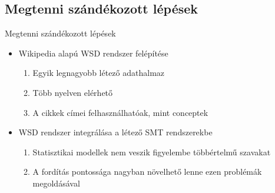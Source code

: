 \subsection{Megtenni szándékozott lépések}

\begin{frame}{Megtenni szándékozott lépések}
	
	\begin{itemize}
		
		\item Wikipedia alapú WSD rendszer felépítése
		\begin{enumerate}
			\item Egyik legnagyobb létező adathalmaz
			\item Több nyelven elérhető
			\item A cikkek címei felhasználhatóak, mint conceptek
		\end{enumerate}
		
		\item WSD rendszer integrálása a létező SMT rendszerekbe
		\begin{enumerate}
			\item Statisztikai modellek nem veszik figyelembe többértelmű szavakat
			\item A fordítás pontossága nagyban növelhető lenne ezen problémák megoldásával
		\end{enumerate}
		
	\end{itemize}

\end{frame}

\newcommand{\savecounter}{\setcounter{enumcounter}{\theenumi}}
\newcommand{\restorecounter}{\setcounter{enumi}{\theenumcounter}}

